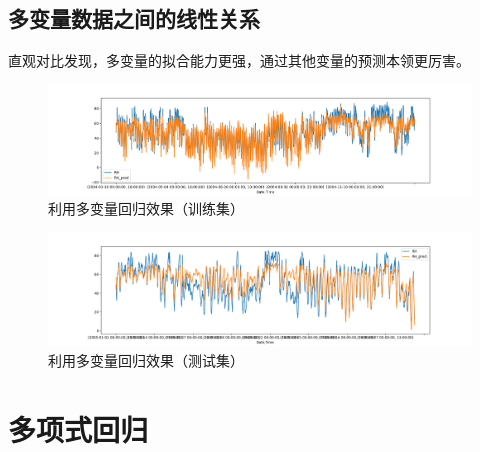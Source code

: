\documentclass{ctexart}
\begin{document}
\subsection{多变量数据之间的线性关系}
直观对比发现，多变量的拟合能力更强，通过其他变量的预测本领更厉害。
\begin{figure}[H]
	\includegraphics[width=1.2\textwidth]{../images/muti.png}
	\caption{利用多变量回归效果（训练集）}
\end{figure}
\begin{figure}[H]
	\includegraphics[width=1.2\textwidth]{../images/mx.png}
	\caption{利用多变量回归效果（测试集）}
\end{figure}

\section{多项式回归}
\end{document}
